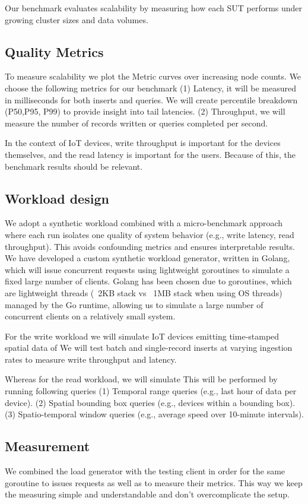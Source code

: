 Our benchmark evaluates scalability by measuring how each SUT performs under growing cluster sizes and data volumes.

\subsection{Quality Metrics}
To measure scalability we plot the Metric curves over increasing node counts.
We choose the following metrics for our benchmark
(1) Latency, it will be measured in milliseconds for both inserts and queries. We will create percentile breakdown (P50,P95, P99) to provide insight into tail latencies.
(2) Throughput, we will measure the number of records written or queries completed per second.

In the context of IoT devices, write throughput is important for the devices themselves, and the read latency is important for the users.
Because of this, the benchmark results should be relevant.

\subsection{Workload design}
We adopt a synthetic workload combined with a micro-benchmark approach where each run isolates one quality of system behavior (e.g., write latency, read throughput).
This avoids confounding metrics and ensures interpretable results. We have developed a custom synthetic workload generator, written in Golang, which will issue concurrent requests using lightweight goroutines to simulate a fixed large number of clients.
Golang has been chosen due to goroutines, which are lightweight threads (~2KB stack vs ~1MB stack when using OS threads) managed by the Go runtime, allowing us to simulate a large number of concurrent clients on a relatively small system.

For the write workload we will simulate IoT devices emitting time-stamped spatial data of %
We will test batch and single-record inserts at varying ingestion rates to measure write throughput and latency.

Whereas for the read workload, we will simulate %
This will be performed by running following queries
(1) Temporal range queries (e.g., last hour of data per device).
(2) Spatial bounding box queries (e.g., devices within a bounding box).
(3) Spatio-temporal window queries (e.g., average speed over 10-minute intervals).

\subsection{Measurement}
We combined the load generator with the testing client in order for the same goroutine to issues requests as well as to measure their metrics.
This way we keep the measuring simple and understandable and don't overcomplicate the setup.

